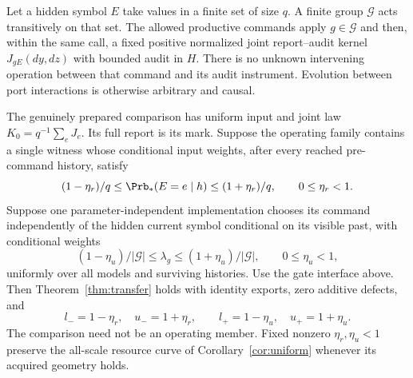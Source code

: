 \begin{theorem}\label{thm:classical}
Let a hidden symbol $E$ take values in a finite set of size $q$. A finite group $\mathcal G$ acts transitively on that set. The allowed productive commands apply $g\in\mathcal G$ and then, within the same call, a fixed positive normalized joint report--audit kernel $J_{gE}(dy,dz)$ with bounded audit in $H$. There is no unknown intervening operation between that command and its audit instrument. Evolution between port interactions is otherwise arbitrary and causal.

The genuinely prepared comparison has uniform input and joint law $K_0=q^{-1}\sum_eJ_e$. Its full report is its mark. Suppose the operating family contains a single witness whose conditional input weights, after every reached pre-command history, satisfy
\[
 (1-\eta_r)/q\le\Prb_*(E=e\mid h)\le(1+\eta_r)/q,
 \qquad 0\le\eta_r<1.
\]
Suppose one parameter-independent implementation chooses its command independently of the hidden current symbol conditional on its visible past, with conditional weights
\[
 (1-\eta_u)/|\mathcal G|\le\lambda_g\le(1+\eta_u)/|\mathcal G|,
 \qquad0\le\eta_u<1,
\]
uniformly over all models and surviving histories. Use the gate interface above. Then Theorem~\ref{thm:transfer} holds with identity exports, zero additive defects, and
\begin{equation}\label{eq:classical-relative}
 l_-=1-\eta_r,\quad u_-=1+\eta_r,
 \qquad l_+=1-\eta_u,\quad u_+=1+\eta_u.
\end{equation}
The comparison need not be an operating member. Fixed nonzero $\eta_r,\eta_u<1$ preserve the all-scale resource curve of Corollary~\ref{cor:uniform} whenever its acquired geometry holds.
\end{theorem}
